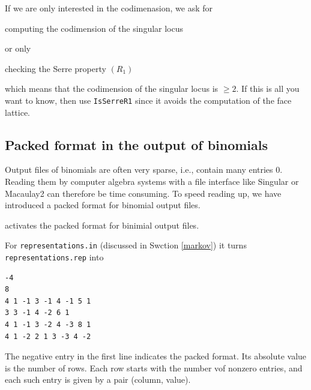 If we are only interested in the codimenasion, we ask for
\begin{itemize}
	\itemtt[CodimSingularLocus] computing the codimension of the singular locus
\end{itemize}
or only
\begin{itemize}
	\itemtt[IsSerreR1] checking the Serre property $(R_1)$
\end{itemize}
which means that the codimension of the singular locus is $\ge 2$. If this is all you want to know, then use \verb|IsSerreR1| since it avoids the computation of the face lattice.

\subsection{Packed format in the output of binomials}\label{BinomialsPacked}

Output files of binomials are often very sparse, i.e., contain many entries $0$. Reading them by computer  algebra systems with a file interface like Singular or Macaulay2 can therefore be time consuming. To speed reading up, we have introduced a packed format for binomial output files.
\begin{itemize}
	\itemtt[BinomialsPacked] activates the packed format for binimial output files.
\end{itemize}
For \verb|representations.in| (discussed in Swction \ref{markov}) it turns \verb|representations.rep| into
\begin{Verbatim}
-4
8
4 1 -1 3 -1 4 -1 5 1 
3 3 -1 4 -2 6 1 
4 1 -1 3 -2 4 -3 8 1 
4 1 -2 2 1 3 -3 4 -2
\end{Verbatim}
The negative entry in the first line indicates the packed format. Its absolute value is the number of rows. Each row starts with the number vof nonzero entries, and each such entry is given by a pair (column, value).



